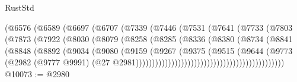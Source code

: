 \begin{lexlean}{RustStd}
\begin{coremodule}
                                (@6576
                                  (@6589
                                    (@6697
                                      (@6707
                                        (@7339
                                          (@7446
                                            (@7531
                                              (@7641
                                                (@7733
                                                  (@7803
                                                    (@7873
                                                      (@7922
                                                        (@8030
                                                          (@8079
                                                            (@8258
                                                              (@8285
                                                                (@8336
                                                                  (@8380
                                                                    (@8734
                                                                      (@8841
                                                                        (@8848
                                                                          (@8892
                                                                            (@9034
                                                                              (@9080
                                                                                (@9159
                                                                                  (@9267
                                                                                    (@9375
                                                                                      (@9515
                                                                                        (@9644
                                                                                          (@9773
                                                                                            (@2982
                                                                                              (@9777
                                                                                                @9991)
                                                                                              (@27
                                                                                                @2981))))))))))))))))))))))))))))))))))))))))))))))
@10073 := @2980

\end{coremodule}
\end{lexlean}
